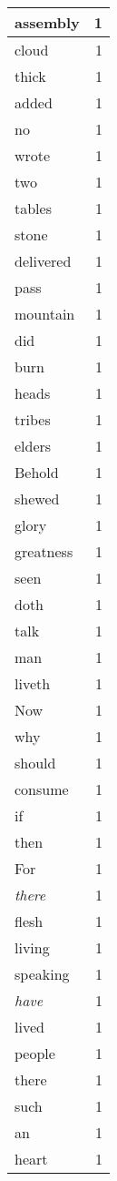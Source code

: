 \begin{center}
\begin{longtable}{l|r}
assembly & 1 \\ \hline
cloud & 1 \\ \hline
thick & 1 \\ \hline
added & 1 \\ \hline
no & 1 \\ \hline
wrote & 1 \\ \hline
two & 1 \\ \hline
tables & 1 \\ \hline
stone & 1 \\ \hline
delivered & 1 \\ \hline
pass & 1 \\ \hline
mountain & 1 \\ \hline
did & 1 \\ \hline
burn & 1 \\ \hline
heads & 1 \\ \hline
tribes & 1 \\ \hline
elders & 1 \\ \hline
Behold & 1 \\ \hline
shewed & 1 \\ \hline
glory & 1 \\ \hline
greatness & 1 \\ \hline
seen & 1 \\ \hline
doth & 1 \\ \hline
talk & 1 \\ \hline
man & 1 \\ \hline
liveth & 1 \\ \hline
Now & 1 \\ \hline
why & 1 \\ \hline
should & 1 \\ \hline
consume & 1 \\ \hline
if & 1 \\ \hline
then & 1 \\ \hline
For & 1 \\ \hline
\emph{there} & 1 \\ \hline
flesh & 1 \\ \hline
living & 1 \\ \hline
speaking & 1 \\ \hline
\emph{have} & 1 \\ \hline
lived & 1 \\ \hline
people & 1 \\ \hline
there & 1 \\ \hline
such & 1 \\ \hline
an & 1 \\ \hline
heart & 1 \\ \hline

\end{longtable}
\end{center}
